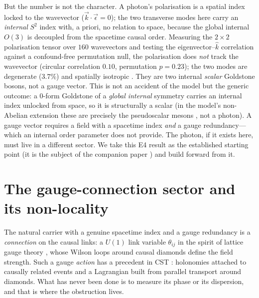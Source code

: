 \documentclass[aps,prd,reprint,nofootinbib,superscriptaddress,floatfix]{revtex4-2}
\begin{document}
But the number is not the character. A photon's polarisation is a spatial index locked
to the wavevector ($\vec k\!\cdot\!\vec\epsilon=0$); the two transverse modes here carry
an \emph{internal} $S^2$ index with, a priori, no relation to space, because the global
internal $O(3)$ is decoupled from the spacetime causal order. Measuring the
$2\times2$ polarisation tensor over $160$ wavevectors and testing the
eigenvector--$\hat k$ correlation against a confound-free permutation null, the
polarisation does \emph{not} track the wavevector (circular correlation $0.10$,
permutation $p=0.23$); the two modes are degenerate ($3.7\%$) and spatially isotropic
\cite{GoldstonePRD}. They are two internal \emph{scalar} Goldstone bosons, not a gauge
vector. This is not an accident of the model but the generic outcome: a $0$-form
Goldstone of a \emph{global internal} symmetry carries an internal index unlocked from
space, so it is structurally a scalar (in the model's non-Abelian extension these are
precisely the pseudoscalar mesons \cite{GellMann1962}, not a photon). A gauge vector
requires a field with a spacetime index \emph{and} a gauge redundancy---which an
internal order parameter does not provide. The photon, if it exists here, must live in a
different sector. We take this E4 result as the established starting point (it is the
subject of the companion paper \cite{GoldstonePRD}) and build forward from it.

\section{The gauge-connection sector and its non-locality}\label{sec:link}

The natural carrier with a genuine spacetime index and a gauge redundancy is a
\emph{connection} on the causal links: a $U(1)$ link variable $\theta_{ij}$ in the
spirit of lattice gauge theory \cite{Wilson1974}, whose Wilson loops around causal
diamonds define the field strength. Such a gauge \emph{action} has a precedent in CST
\cite{Sverdlov2008,SverdlovBombelli2009}: holonomies attached to causally related events
and a Lagrangian built from parallel transport around diamonds. What has never been done
is to measure its phase or its dispersion, and that is where the obstruction lives.
\end{document}
